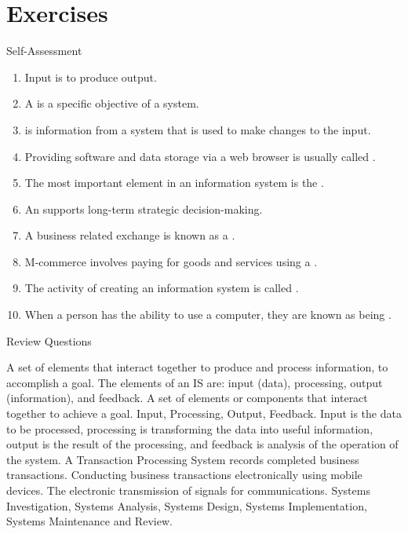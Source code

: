 \documentclass[\main/notes.tex]{subfiles}
\begin{document}
			\section{Exercises}
				\begin{exercise}{Self-Assessment}
					\begin{enumerate}
						\item Input is  to produce output.
						\item A  is a specific objective of a system.
						\item {} is information from a system that is used to make changes to the input.
						\item Providing software and data storage via a web browser is usually called .
						\item The most important element in an information system is the .
						\item An  supports long-term strategic decision-making.
						\item A business related exchange is known as a .
						\item M-commerce involves paying for goods and services using a .
						\item The activity of creating an information system is called .
						\item When a person has the ability to use a computer, they are known as being .
					\end{enumerate}
				\end{exercise}
				\begin{exercise}{Review Questions}
					\begin{enumerate}
						 A set of elements that interact together to produce and process information, to accomplish a goal. The elements of an IS are: input (data), processing, output (information), and feedback.
						 A set of elements or components that interact together to achieve a goal.
						 Input, Processing, Output, Feedback. Input is the data to be processed, processing is transforming the data into useful information, output is the result of the processing, and feedback is analysis of the operation of the system.
						 A Transaction Processing System records completed business transactions.
						 Conducting business transactions electronically using mobile devices.
						 The electronic transmission of signals for communications.
						 Systems Investigation, Systems Analysis, Systems Design, Systems Implementation, Systems Maintenance and Review.
					\end{enumerate}
				\end{exercise}
		\vbox{}
\end{document}
